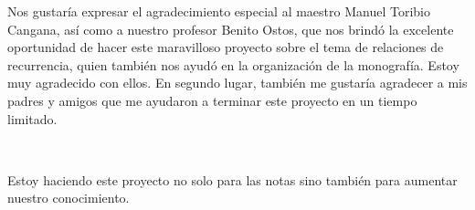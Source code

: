 Nos gustaría expresar el agradecimiento especial al maestro Manuel Toribio Cangana, así como a nuestro profesor Benito Ostos, que nos brindó la excelente oportunidad de hacer este maravilloso proyecto sobre el tema de relaciones de recurrencia, quien también nos ayudó en la organización de la monografía. Estoy muy agradecido con ellos. En segundo lugar, también me gustaría agradecer a mis padres y amigos que me ayudaron a terminar este proyecto en un tiempo limitado.\par

\

Estoy haciendo este proyecto no solo para las notas sino también para aumentar nuestro conocimiento.